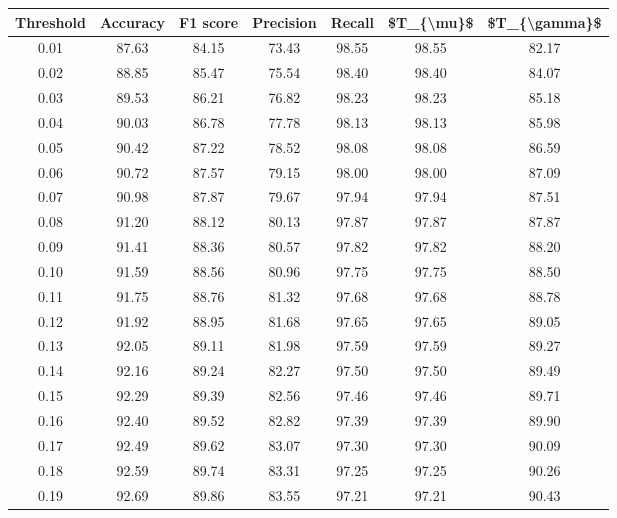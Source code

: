 \begin{tabular}{|c|c|c|c|c|c|c|}
\hline
 Threshold &  Accuracy &  F1 score &  Precision &  Recall &  \$T\_\{\textbackslash mu\}\$ &  \$T\_\{\textbackslash gamma\}\$ \\
\hline
      0.01 &     87.63 &     84.15 &      73.43 &   98.55 &      98.55 &         82.17 \\
      0.02 &     88.85 &     85.47 &      75.54 &   98.40 &      98.40 &         84.07 \\
      0.03 &     89.53 &     86.21 &      76.82 &   98.23 &      98.23 &         85.18 \\
      0.04 &     90.03 &     86.78 &      77.78 &   98.13 &      98.13 &         85.98 \\
      0.05 &     90.42 &     87.22 &      78.52 &   98.08 &      98.08 &         86.59 \\
      0.06 &     90.72 &     87.57 &      79.15 &   98.00 &      98.00 &         87.09 \\
      0.07 &     90.98 &     87.87 &      79.67 &   97.94 &      97.94 &         87.51 \\
      0.08 &     91.20 &     88.12 &      80.13 &   97.87 &      97.87 &         87.87 \\
      0.09 &     91.41 &     88.36 &      80.57 &   97.82 &      97.82 &         88.20 \\
      0.10 &     91.59 &     88.56 &      80.96 &   97.75 &      97.75 &         88.50 \\
      0.11 &     91.75 &     88.76 &      81.32 &   97.68 &      97.68 &         88.78 \\
      0.12 &     91.92 &     88.95 &      81.68 &   97.65 &      97.65 &         89.05 \\
      0.13 &     92.05 &     89.11 &      81.98 &   97.59 &      97.59 &         89.27 \\
      0.14 &     92.16 &     89.24 &      82.27 &   97.50 &      97.50 &         89.49 \\
      0.15 &     92.29 &     89.39 &      82.56 &   97.46 &      97.46 &         89.71 \\
      0.16 &     92.40 &     89.52 &      82.82 &   97.39 &      97.39 &         89.90 \\
      0.17 &     92.49 &     89.62 &      83.07 &   97.30 &      97.30 &         90.09 \\
      0.18 &     92.59 &     89.74 &      83.31 &   97.25 &      97.25 &         90.26 \\
      0.19 &     92.69 &     89.86 &      83.55 &   97.21 &      97.21 &         90.43 \\

\end{tabular}
